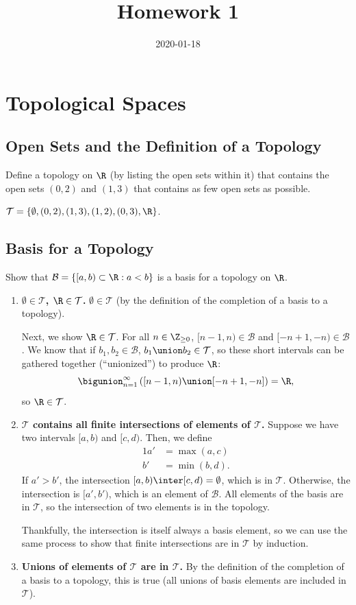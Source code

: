 \documentclass[twocolumn, noxcolor, maketitle]{rbt-mathnotes-hw}
\title{Homework 1}
\date{2020-01-18}
\def\T{\mathcal{T}}
\def\basis{\mathcal{B}}
\begin{document}
\maketitle

\section{Topological Spaces}
\subsection{Open Sets and the Definition of a Topology}
\begin{problem}[1.7]
  Define a topology on $\R$ (by listing the open sets within it) that contains
  the open sets $(0,2)$ and $(1,3)$ that contains as few open sets as possible.
\end{problem}
$\T = \{ \emptyset, (0,2), (1,3), (1,2), (0,3), \R \}$.

\subsection{Basis for a Topology}
\begin{problem}[1.10]
  Show that $\mathcal{B} = \{[a,b) \subset \R : a < b\}$ is a basis for a
  topology on $\R$.
\end{problem}
\begin{enumerate}
  \item \textbf{$\emptyset \in \T$, $\R \in \T$.} $\emptyset \in \T$ (by the
    definition of the completion of a basis to a topology).

    Next, we show $\R \in \T$. For all $n \in \Z_{\ge 0}$, $[n-1, n) \in \basis$
    and $[-n + 1, -n) \in \basis$. We know that if $b_1, b_2 \in \basis$, $b_1
    \union b_2 \in \T$, so these short intervals can be gathered together (``unionized'')
    to produce $\R$:
    \[ \bigunion_{n=1}^{\infty} \left( [n-1, n) \union [-n + 1, -n] \right) = \R, \]
    so $\R \in \T$.

  \item \textbf{$\T$ contains all finite intersections of elements of $\T$.}
    Suppose we have two intervals $[a, b)$ and $[c, d)$. Then, we define
    \begin{alignat*}{1}
      a' &= \max(a, c) \\
      b' &= \min(b, d).
    \end{alignat*}
    If $a' > b'$, the intersection $[a, b) \inter [c, d) = \emptyset$, which is
    in $\T$. Otherwise, the intersection is $[a', b')$, which is an element of
    $\basis$. All elements of the basis are in $\T$, so the intersection of two
    elements is in the topology.

    Thankfully, the intersection is itself always a basis element, so we can
    use the same process to show that finite intersections are in $\T$ by
    induction.

  \item \textbf{Unions of elements of $\T$ are in $\T$.} By the definition of
    the completion of a basis to a topology, this is true (all unions of basis
    elements are included in $\T$).
\end{enumerate}
\end{document}
